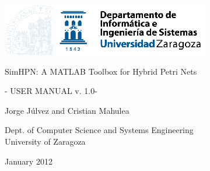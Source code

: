 
\noindent

\vfill
\includegraphics[scale=2]{figs/uz-w.eps} \hspace{5cm}  \includegraphics[scale=1.8]{figs/diis-c.eps}
\begin{center}
    \Large

\end{center}

\vfill
\begin{center}
    \Large

\end{center}

\vfill
\begin{center}
    \Huge
    SimHPN: A MATLAB Toolbox for Hybrid Petri Nets\\
\end{center}

\begin{center}
\Large
    - USER MANUAL v. 1.0-\\
\end{center}


\vfill
\begin{center}
    \Large

\end{center}
\begin{center}
   \Large
   Jorge J\'ulvez and Cristian Mahulea
\end{center}


\vfill
\begin{center}
    \Large

\end{center}




\begin{center}
\Large
    Dept. of Computer Science and Systems Engineering\\
    University of Zaragoza\\
\end{center}


\vfill
\begin{center}
\Large

\end{center}



\begin{center}
\Large
    January 2012
\end{center}


